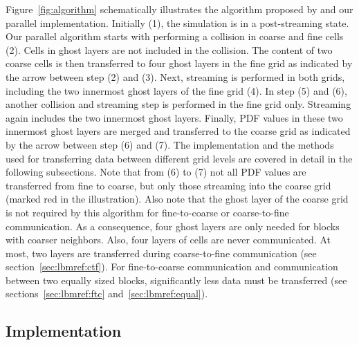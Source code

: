 \documentclass[final,leqno,onefignum,onetabnum]{siamltex1213}
\begin{document}
Figure~\ref{fig:algorithm} schematically illustrates the algorithm proposed by \cite{Rohde2006} and our parallel implementation.
Initially (1), the simulation is in a post-streaming state. Our parallel algorithm starts with performing a collision in coarse and fine cells (2).
Cells in ghost layers are not included in the collision.
The content of two coarse cells is then transferred to four ghost layers in the fine grid as indicated by the arrow between step (2) and (3).
Next, streaming is performed in both grids, including the two innermost ghost layers of the fine grid (4).
In step (5) and (6), another collision and streaming step is performed in the fine grid only. Streaming again includes the two innermost ghost layers.
Finally, PDF values in these two innermost ghost layers are merged and transferred to the coarse grid as indicated by the arrow between step (6) and (7).
The implementation and the methods used for transferring data between different grid levels are covered in detail in the following subsections.
Note that from (6) to (7) not all PDF values are transferred from fine to coarse, but only those streaming into the coarse grid (marked red in the illustration).
Also note that the ghost layer of the coarse grid is not required by this algorithm for fine-to-coarse or coarse-to-fine communication.
As a consequence, four ghost layers are only needed for blocks with coarser neighbors. Also, four layers of cells are never communicated.
At most, two layers are transferred during coarse-to-fine communication (see section~\ref{sec:lbmref:ctf}).
For fine-to-coarse communication and communication between two equally sized blocks, significantly less data must be transferred (see sections~\ref{sec:lbmref:ftc} and~\ref{sec:lbmref:equal}).

\subsection{Implementation}\label{sec:lbmref:algo}
\end{document}

